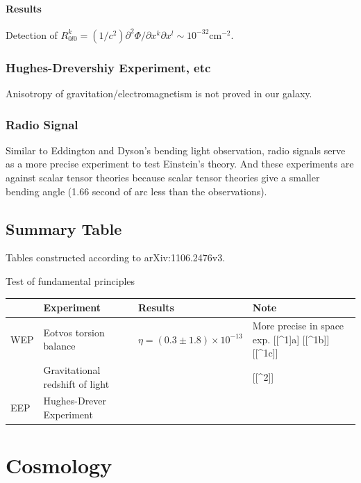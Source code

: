 \documentclass[letterpaper,10pt,english]{sphinxmanual}
\begin{document}
{\paragraph{Results}
\label{GeneralRelativityAdv:results}
Detection of
$R^k_{0l0}=(1/c^2)\partial^2\Phi/\partial x^k\partial x^l \sim 10^{-32} \text{cm}^{-2}$.


\subsubsection{Hughes-Drevershiy Experiment, etc}
\label{GeneralRelativityAdv:hughes-drevershiy-experiment-etc}
Anisotropy of gravitation/electromagnetism is not proved in our galaxy.


\subsubsection{Radio Signal}
\label{GeneralRelativityAdv:radio-signal}
Similar to Eddington and Dyson's bending light observation, radio
signals serve as a more precise experiment to test Einstein's theory.
And these experiments are against scalar tensor theories because scalar
tensor theories give a smaller bending angle (1.66 second of arc less
than the observations).


\subsection{Summary Table}
\label{GeneralRelativityAdv:summary-table}
Tables constructed according to arXiv:1106.2476v3.

Test of fundamental principles

\begin{tabulary}{\linewidth}{|L|L|L|L|}
\hline
\textsf{\relax } & \textsf{\relax 
Experiment
} & \textsf{\relax 
Results
} & \textsf{\relax 
Note
}\\
\hline
WEP
 & 
Eotvos torsion balance
 & 
$\eta = (0.3 \pm 1.8) \times 10^{-13}$
 & 
More precise in space exp. {[}{[}\textasciicircum{}1{]}a{]} {[}{[}\textasciicircum{}1b{]}{]} {[}{[}\textasciicircum{}1c{]}{]}
\\
 & 
Gravitational redshift of light
 &  & 
{[}{[}\textasciicircum{}2{]}{]}
\\

EEP
 & 
Hughes-Drever Experiment
 &  & \\
\hline\end{tabulary}



\section{Cosmology}
\label{Cosmology/cosmoIndex::doc}\label{Cosmology/cosmoIndex:cosmology}

}
\end{document}
